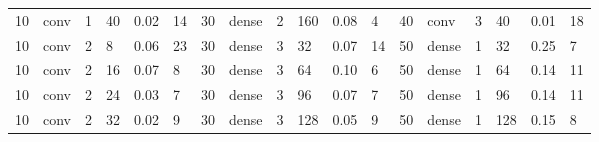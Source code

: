 \begin{table}
{\begin{tabular}{@{}llllll|llllll|llllll@{}}
10                              & conv                           & 1                              & 40                             & 0.02                             & 14                                & 30                              & dense                          & 2                              & 160                            & 0.08                           & 4                                 & 40                              & conv                           & 3                              & 40                             & 0.01                           & 18                               \\
10                              & conv                           & 2                              & 8                              & 0.06                             & 23                                & 30                              & dense                          & 3                              & 32                             & 0.07                           & 14                                & 50                              & dense                          & 1                              & 32                             & 0.25                           & 7                                \\
10                              & conv                           & 2                              & 16                             & 0.07                             & 8                                 & 30                              & dense                          & 3                              & 64                             & 0.10                           & 6                                 & 50                              & dense                          & 1                              & 64                             & 0.14                           & 11                               \\
10                              & conv                           & 2                              & 24                             & 0.03                             & 7                                 & 30                              & dense                          & 3                              & 96                             & 0.07                           & 7                                 & 50                              & dense                          & 1                              & 96                             & 0.14                           & 11                               \\
10                              & conv                           & 2                              & 32                             & 0.02                             & 9                                 & 30                              & dense                          & 3                              & 128                            & 0.05                           & 9                                 & 50                              & dense                          & 1                              & 128                            & 0.15                           & 8                                \\

\end{tabular}}
\end{table}
